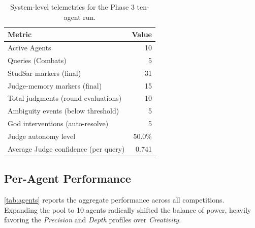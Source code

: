 \documentclass[11pt, a4paper]{article}
\begin{document}
\begin{table}[H]
\centering
{}
\begin{tabular}{@{}lr@{}}
\toprule
\textbf{Metric} & \textbf{Value} \\
\midrule
Active Agents & 10 \\
Queries (Combats) & 5 \\
StudSar markers (final) & 31 \\
Judge-memory markers (final) & 15 \\
Total judgments (round evaluations) & 10 \\
Ambiguity events (below threshold) & 5 \\
God interventions (auto-resolve) & 5 \\
Judge autonomy level & 50.0\% \\
Average Judge confidence (per query) & 0.741 \\
\bottomrule
\end{tabular}
\caption{System-level telemetrics for the Phase 3 ten-agent run.}
\label{tab:system}
\end{table}

\subsection{Per-Agent Performance}
\cref{tab:agents} reports the aggregate performance across all competitions. Expanding the pool to 10 agents radically shifted the balance of power, heavily favoring the \textit{Precision} and \textit{Depth} profiles over \textit{Creativity}.
\end{document}
